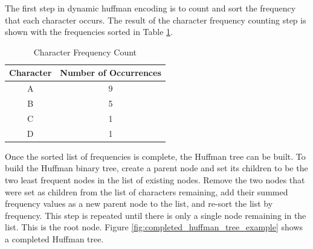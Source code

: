 \documentclass[doublespace,nopageskip]{VTthesis}
\begin{document}
The first step in dynamic huffman encoding is to count and sort the frequency that each character occurs. The result of the character frequency counting step is shown with the frequencies sorted in Table \ref{tab:character_frequency_count}.

\begin{table}[htb]
	\centering
	\caption{Character Frequency Count}
	\begin{tabular}{cc}
	    \toprule
	    Character & Number of Occurrences\\
	    \midrule
	    A & 9 \\
	    \midrule
	    B & 5 \\
	    \midrule
	    C & 1 \\
	    \midrule
	    D & 1 \\
	    \bottomrule
	\end{tabular}
	\label{tab:character_frequency_count}
\end{table}

Once the sorted list of frequencies is complete, the Huffman tree can be built. To build the Huffman binary tree, create a parent node and set its children to be the two least frequent nodes in the list of existing nodes. Remove the two nodes that were set as children from the list of characters remaining, add their summed frequency values as a new parent node to the list, and re-sort the list by frequency. This step is repeated until there is only a single node remaining in the list. This is the root node. Figure \ref{fig:completed_huffman_tree_example} shows a completed Huffman tree.
\end{document}
